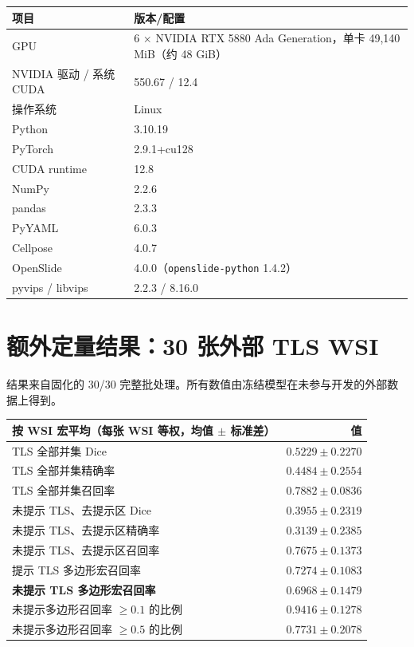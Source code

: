 \documentclass[11pt,letterpaper]{ctexart}
\newcommand{\code}[1]{\texttt{#1}}
\begin{document}
\begin{center}\small
\begin{tabular}{ll}
\toprule
项目 & 版本/配置\\ \midrule
GPU & 6 $\times$ NVIDIA RTX 5880 Ada Generation，单卡 49,140 MiB（约 48 GiB）\\
NVIDIA 驱动 / 系统 CUDA & 550.67 / 12.4\\
操作系统 & Linux\\
Python & 3.10.19\\
PyTorch & 2.9.1+cu128\\
CUDA runtime & 12.8\\
NumPy & 2.2.6\\
pandas & 2.3.3\\
PyYAML & 6.0.3\\
Cellpose & 4.0.7\\
OpenSlide & 4.0.0（\code{openslide-python} 1.4.2）\\
pyvips / libvips & 2.2.3 / 8.16.0\\
\bottomrule
\end{tabular}
\end{center}

\section{额外定量结果：30 张外部 TLS WSI}
结果来自固化的 30/30 完整批处理。所有数值由冻结模型在未参与开发的外部数据上得到。

\begin{center}\small
\begin{tabular}{lr}
\toprule
按 WSI 宏平均（每张 WSI 等权，均值 $\pm$ 标准差） & 值\\ \midrule
TLS 全部并集 Dice & $0.5229\pm0.2270$\\
TLS 全部并集精确率 & $0.4484\pm0.2554$\\
TLS 全部并集召回率 & $0.7882\pm0.0836$\\
未提示 TLS、去提示区 Dice & $0.3955\pm0.2319$\\
未提示 TLS、去提示区精确率 & $0.3139\pm0.2385$\\
未提示 TLS、去提示区召回率 & $0.7675\pm0.1373$\\
提示 TLS 多边形宏召回率 & $0.7274\pm0.1083$\\
\textbf{未提示 TLS 多边形宏召回率} & \textbf{$0.6968\pm0.1479$}\\
未提示多边形召回率 $\geq0.1$ 的比例 & $0.9416\pm0.1278$\\
未提示多边形召回率 $\geq0.5$ 的比例 & $0.7731\pm0.2078$\\
\bottomrule
\end{tabular}
\end{center}
\end{document}
